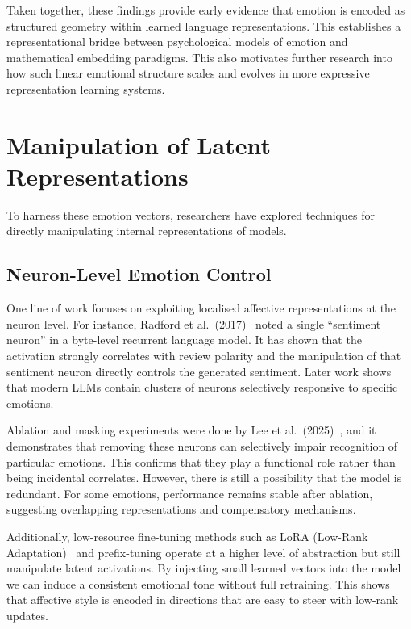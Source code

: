 \documentclass[12pt,twoside]{report}
\begin{document}
Taken together, these findings provide early evidence that emotion is encoded as structured geometry within learned language representations. This establishes a representational bridge between psychological models of emotion and mathematical embedding paradigms. This also motivates further research into how such linear emotional structure scales and evolves in more expressive representation learning systems.

\section{Manipulation of Latent Representations}

To harness these emotion vectors, researchers have explored techniques for directly manipulating internal representations of models.

\subsection{Neuron-Level Emotion Control}

One line of work focuses on exploiting localised affective representations at the neuron level. For instance, Radford et al.\ (2017)~\cite{radford2017learninggeneratereviewsdiscovering} noted a single ``sentiment neuron'' in a byte-level recurrent language model. It has shown that the activation strongly correlates with review polarity and the manipulation of that sentiment neuron directly controls the generated sentiment. Later work shows that modern LLMs contain clusters of neurons selectively responsive to specific emotions. 

Ablation and masking experiments were done by Lee et al.\ (2025)~\cite{lee-etal-2025-large}, and it demonstrates that removing these neurons can selectively impair recognition of particular emotions. This confirms that they play a functional role rather than being incidental correlates. However, there is still a possibility that the model is redundant. For some emotions, performance remains stable after ablation, suggesting overlapping representations and compensatory mechanisms.

Additionally, low-resource fine-tuning methods such as LoRA (Low-Rank Adaptation)~\cite{hu2021loralowrankadaptationlarge} and prefix-tuning operate at a higher level of abstraction but still manipulate latent activations. By injecting small learned vectors into the model we can induce a consistent emotional tone without full retraining. This shows that affective style is encoded in directions that are easy to steer with low-rank updates.
\end{document}
